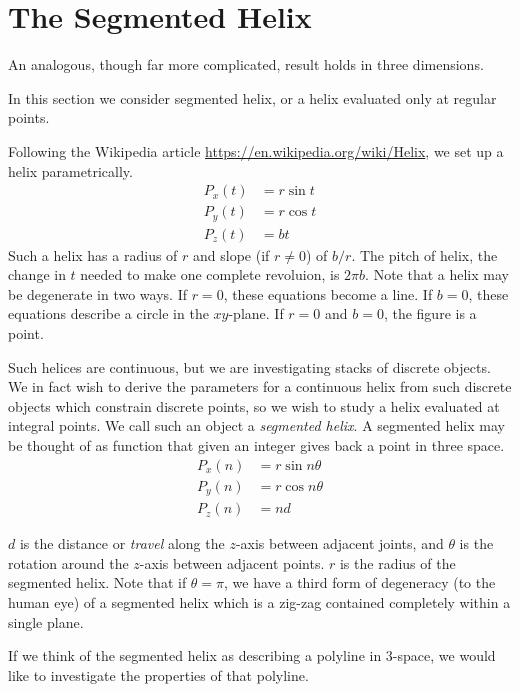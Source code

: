 \documentclass[11pt]{article}
\begin{document}
{\label{sec:2d}

\section{The Segmented Helix}

An analogous, though far more complicated, result holds in three dimensions.

In this section we consider segmented helix, or a helix evaluated only at regular points.

Following the Wikipedia article \url{https://en.wikipedia.org/wiki/Helix}, we set up a helix parametrically.
\begin{align*}
    P_x(t) &= r \sin{t}  \\
    P_y(t) &= r \cos{t} \\
   P_z(t) &= b t
\end{align*}
Such a helix has a radius of $r$ and slope (if $r \neq 0$) of $b/r$.
The pitch of helix, the change in $t$ needed to make one complete revoluion, is $2\pi b$. Note that a helix may be degenerate in two ways.
If $r = 0$, these equations become a line. If $b = 0$, these equations describe a circle in the $xy$-plane.
If $r = 0$ and $b = 0$, the figure is a point.

Such helices are continuous, but we are investigating stacks of discrete objects. We in fact wish to derive
the parameters for a continuous helix from such discrete objects which constrain discrete points, so we wish
to study a helix evaluated at integral points. We call such an object a {\em segmented helix}.
A segmented helix may be thought of as function that given an integer gives back a point in three space.
\begin{align*}
    P_x(n) &= r \sin{n \theta}  \\
    P_y(n) &= r \cos{n \theta} \\
   P_z(n) &= n d
\end{align*}

$d$ is the distance or {\em travel} along the $z$-axis between adjacent joints, and $\theta$ is the rotation around the $z$-axis
between adjacent points. $r$ is the radius of the segmented helix.  Note that if $\theta = \pi$, we have a third form of degeneracy (to the human eye) of a segmented helix
which is a zig-zag contained completely within a single plane.

If we think of the segmented helix as describing a polyline in 3-space, we would like to investigate
the properties of that polyline.

}
\end{document}
